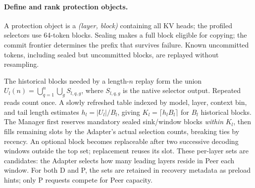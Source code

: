 \paragraph{Define and rank protection objects.}
A protection object is a \emph{(layer, block)} containing all KV heads;
the profiled selectors use 64-token blocks. Sealing makes a full block
eligible for copying; the commit frontier determines the prefix that
survives failure. Known uncommitted tokens, including sealed but
uncommitted blocks, are replayed without resampling.

The historical blocks needed by a length-$n$ replay form the union
$U_l(n)=\bigcup_{q=1}^{n}\bigcup_g S_{l,q,g}$, where $S_{l,q,g}$ is the
native selector output. Repeated reads count once. A slowly refreshed
table indexed by model, layer, context bin, and tail length estimates
$h_l=|U_l|/B_l$, giving $K_l=\lceil h_lB_l\rceil$ for $B_l$ historical
blocks. The Manager first reserves mandatory sealed sink/window blocks
\emph{within} $K_l$, then fills remaining slots by the Adapter's actual
selection counts, breaking ties by recency. An optional block becomes
replaceable after two successive decoding windows outside the top set;
replacement reuses its slot. These per-layer sets are candidates: the
Adapter selects how many leading layers reside in Peer each window.
For both D and P, the sets are retained in recovery metadata as preload
hints; only P requests compete for Peer capacity.

